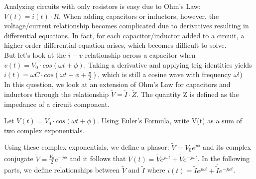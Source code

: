 

Analyzing circuits with only resistors is easy due to Ohm's Law: $V(t)=i(t) \cdot{} R$.
When adding capacitors or inductors, however, the voltage/current relationship becomes complicated due to derivatives resulting in differential equations.
In fact, for each capacitor/inductor added to a circuit, a higher order differential equation arises, which becomes difficult to solve.\\

But let's look at the $i-v$ relationship across a capacitor when $v(t) = V_{0} \cdot{} cos(\omega{} t+\phi{})$.
Taking a derivative and applying trig identities yields $i(t)=\omega{}C \cdot{} cos(\omega{} t + \phi{} + \frac{\pi{}}{2})$, which is still a cosine wave with frequency $\omega{}$!)\\

In this question, we look at an extension of Ohm's Law for capacitors and inductors through the relationship $\widetilde{V} = \widetilde{I} \cdot{} \widetilde{Z}$.
The quantity Z is defined as the impedance of a circuit component.

\begin{enumerate}

\qitem Let $V(t) = V_{0} \cdot cos(\omega{}t + \phi{})$.
Using Euler's Formula, write V(t) as a sum of two complex exponentials.

\sol{

}

\end{enumerate}

Using these complex exponentials, we define a phasor: $\widetilde{V} = V_{0}e^{j\phi{}}$ and its complex conjugate $\overline{\widetilde{V}} = \frac{V_{0}}{2}e^{-j\phi{}}$ and it follows that $V(t) = \widetilde{V}e^{j\omega{}t} + \overline{\widetilde{V}}e^{-j\omega{}t}$.
In the following parts, we define relationships between $\widetilde{V}$ and $\widetilde{I}$ where $i(t) = \widetilde{I}e^{j\omega{}t} + \overline{\widetilde{I}}e^{-j\omega{}t}$.

